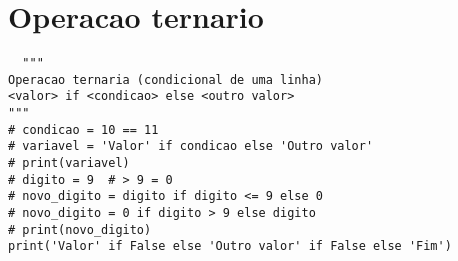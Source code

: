 \documentclass{article}
\begin{document}
\section{Operacao ternario}
\begin{lstlisting}
  """
Operacao ternaria (condicional de uma linha)
<valor> if <condicao> else <outro valor>
"""
# condicao = 10 == 11
# variavel = 'Valor' if condicao else 'Outro valor'
# print(variavel)
# digito = 9  # > 9 = 0
# novo_digito = digito if digito <= 9 else 0
# novo_digito = 0 if digito > 9 else digito
# print(novo_digito)
print('Valor' if False else 'Outro valor' if False else 'Fim')
\end{lstlisting}
\end{document}
